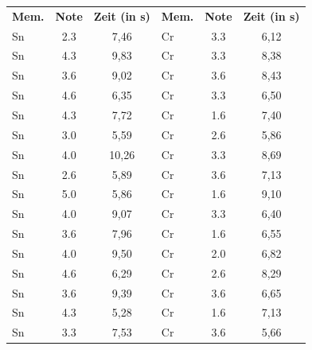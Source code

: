 \begin{table}
  \centering
    \begin{tabular}{l|c|c||l|c|c}
      \textbf{Mem.} & \textbf{Note} & \textbf{Zeit (in s)} & \textbf{Mem.} & \textbf{Note} & \textbf{Zeit (in s)} \\
      Sn            & 2.3           & 7,46                 & Cr            & 3.3           & 6,12     \\
      Sn            & 4.3           & 9,83                 & Cr            & 3.3           & 8,38     \\
      Sn            & 3.6           & 9,02                 & Cr            & 3.6           & 8,43     \\
      Sn            & 4.6           & 6,35                 & Cr            & 3.3           & 6,50     \\
      Sn            & 4.3           & 7,72                 & Cr            & 1.6           & 7,40     \\
      Sn            & 3.0           & 5,59                 & Cr            & 2.6           & 5,86     \\
      Sn            & 4.0           & 10,26                & Cr            & 3.3           & 8,69     \\
      Sn            & 2.6           & 5,89                 & Cr            & 3.6           & 7,13     \\
      Sn            & 5.0           & 5,86                 & Cr            & 1.6           & 9,10     \\
      Sn            & 4.0           & 9,07                 & Cr            & 3.3           & 6,40     \\
      Sn            & 3.6           & 7,96                 & Cr            & 1.6           & 6,55     \\
      Sn            & 4.0           & 9,50                 & Cr            & 2.0           & 6,82     \\
      Sn            & 4.6           & 6,29                 & Cr            & 2.6           & 8,29     \\
      Sn            & 3.6           & 9,39                 & Cr            & 3.6           & 6,65     \\
      Sn            & 4.3           & 5,28                 & Cr            & 1.6           & 7,13     \\
      Sn            & 3.3           & 7,53                 & Cr            & 3.6           & 5,66     \\

\end{tabular}
\end{table}
